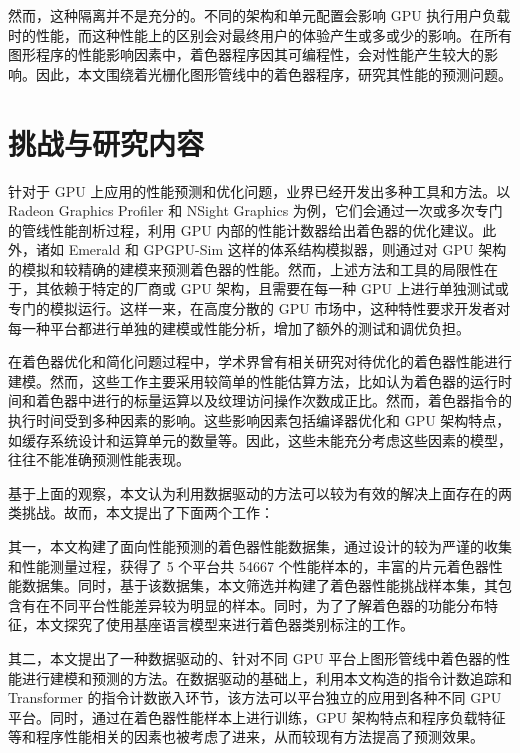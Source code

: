 然而，这种隔离并不是充分的。不同的架构和单元配置会影响 GPU 执行用户负载时的性能，而这种性能上的区别会对最终用户的体验产生或多或少的影响。在所有图形程序的性能影响因素中，着色器程序因其可编程性，会对性能产生较大的影响。因此，本文围绕着光栅化图形管线中的着色器程序，研究其性能的预测问题。

\section{{\amend 挑战与研究内容}}

\label{sec:challenge}

针对于 GPU 上应用的性能预测和优化问题，业界已经开发出多种工具和方法。以 Radeon Graphics Profiler\cite{AMDRGP} 和 NSight Graphics\cite{NSightGraphics} 为例，它们会通过一次或多次专门的管线性能剖析过程，利用 GPU 内部的性能计数器给出着色器的优化建议。此外，诸如 Emerald \cite{10.1145/3307650.3322221} 和 GPGPU-Sim \cite{4919648} 这样的体系结构模拟器，则通过对 GPU 架构的模拟和较精确的建模来预测着色器的性能。然而，上述方法和工具的局限性在于，其依赖于特定的厂商或 GPU 架构，且需要在每一种 GPU 上进行单独测试或专门的模拟运行。这样一来，在高度分散的 GPU 市场中，这种特性要求开发者对每一种平台都进行单独的建模或性能分析，增加了额外的测试和调优负担。

在着色器优化和简化问题过程中，学术界曾有相关研究对待优化的着色器性能进行建模\cite{10.1145/2816795.2818104, 10.1111/cgf.13482, 10.1145/3528233.3530722}。然而，这些工作主要采用较简单的性能估算方法，比如认为着色器的运行时间和着色器中进行的标量运算以及纹理访问操作次数成正比。然而，着色器指令的执行时间受到多种因素的影响。这些影响因素包括编译器优化和 GPU 架构特点，如缓存系统设计和运算单元的数量等。因此，这些未能充分考虑这些因素的模型，往往不能准确预测性能表现。

{\amend 基于上面的观察，本文认为利用数据驱动的方法可以较为有效的解决上面存在的两类挑战。故而，本文提出了下面两个工作：}

{\added 其一，本文构建了面向性能预测的着色器性能数据集，通过设计的较为严谨的收集和性能测量过程，获得了 5 个平台共 54667 个性能样本的，丰富的片元着色器性能数据集。同时，基于该数据集，本文筛选并构建了着色器性能挑战样本集，其包含有在不同平台性能差异较为明显的样本。同时，为了了解着色器的功能分布特征，本文探究了使用基座语言模型来进行着色器类别标注的工作。}

{\amend 其二，本文提出了一种数据驱动的、}针对不同 GPU 平台上图形管线中着色器的性能进行建模和预测的方法。在数据驱动的基础上，{\amend 利用本文构造的指令计数追踪和 Transformer 的指令计数嵌入环节，该方法可以平台独立的应用到各种不同 GPU 平台。}同时，通过在着色器性能样本上进行训练，GPU 架构特点和程序负载特征等和程序性能相关的因素也被考虑了进来，从而较现有方法提高了预测效果。

